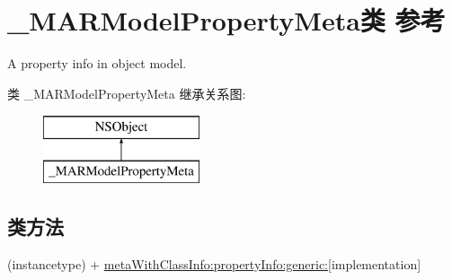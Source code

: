 \hypertarget{interface___m_a_r_model_property_meta}{}\section{\+\_\+\+M\+A\+R\+Model\+Property\+Meta类 参考}
\label{interface___m_a_r_model_property_meta}


A property info in object model.  


类 \+\_\+\+M\+A\+R\+Model\+Property\+Meta 继承关系图\+:\begin{figure}[H]
\begin{center}
\leavevmode
\includegraphics[height=2.000000cm]{interface___m_a_r_model_property_meta}
\end{center}
\end{figure}
\subsection*{类方法}
\begin{DoxyCompactItemize}
\item 
(instancetype) + \hyperlink{interface___m_a_r_model_property_meta_a90afde8b02198311971f9bbbea5c1f8a}{meta\+With\+Class\+Info\+:property\+Info\+:generic\+:}{\ttfamily  \mbox{[}implementation\mbox{]}}
\end{DoxyCompactItemize}
